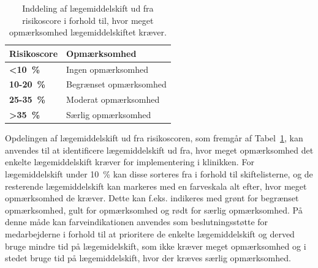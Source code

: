 \vspace{0.5cm}
\begin{table}[H]
\caption{Inddeling af lægemiddelskift ud fra risikoscore i forhold til, hvor meget opmærksomhed lægemiddelskiftet kræver.}
\vspace{2mm}
\label{table:cutoff} 
\centering
\begin{tabular}{|l|l|} \hline
\rowcolor[HTML]{C0C0C0}\textbf{Risikoscore} & \textbf{ Opmærksomhed} \\ \hline
\cellcolor[HTML]{C0C0C0} \textbf{<10~\%} & Ingen opmærksomhed \\ \hline
\cellcolor[HTML]{C0C0C0}\textbf{10-20~\%} & Begrænset opmærksomhed \\ \hline
\cellcolor[HTML]{C0C0C0}\textbf{25-35~\% }& Moderat opmærksomhed  \\ \hline
\cellcolor[HTML]{C0C0C0}\textbf{>35~\%} & Særlig opmærksomhed \\ \hline
\end{tabular}
\end{table}

Opdelingen af lægemiddelskift ud fra risikoscoren, som fremgår af Tabel~\ref{table:cutoff}, kan anvendes til at identificere lægemiddelskift ud fra, hvor meget opmærksomhed det enkelte lægemiddelskift kræver for implementering i klinikken. For lægemiddelskift under 10~\% kan disse sorteres fra i forhold til skiftelisterne, og de resterende lægemiddelskift kan markeres med en farveskala alt efter, hvor meget opmærksomhed de kræver. Dette kan f.eks. indikeres med grønt for begrænset opmærksomhed, gult for opmærksomhed og rødt for særlig opmærksomhed. På denne måde  kan farveindikationen anvendes som beslutningsstøtte for medarbejderne i forhold til at prioritere de enkelte lægemiddelskift og derved bruge mindre tid på lægemidelskift, som ikke kræver meget opmærksomhed og i stedet bruge tid på lægemiddelskift, hvor der kræves særlig opmærksomhed.

